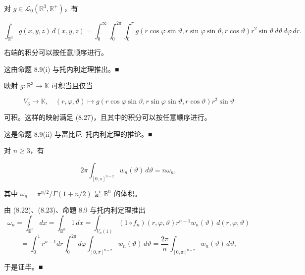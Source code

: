 \begin{example}

\begin{items}
\item

对 $ g \in \mathcal{L}_{0}(\mathbb{R}^{3}, \mathbb{R}^{+}) $，有

\begin{equation}
\int_{\mathbb{R}^{3}} g(x, y, z)\, d(x, y, z) = \int_{0}^{\infty}\int_{0}^{2\pi}\int_{0}^{\pi} g(r\cos\varphi\sin\vartheta, r\sin\varphi\sin\vartheta, r\cos\vartheta)r^{2}\sin\vartheta\, d\vartheta\, d\varphi\, dr.\tag{8.27}
\end{equation}

右端的积分可以按任意顺序进行。

\proofhead
这由命题 8.9(i) 与托内利定理推出。\nobreak\hspace{0.35em}■
\item

映射 $ g: \mathbb{R}^{3} \to \mathbb{K} $ 可积当且仅当

\[
V_{3} \to \mathbb{K}, \quad (r, \varphi, \vartheta) \mapsto g(r\cos\varphi\sin\vartheta, r\sin\varphi\sin\vartheta, r\cos\vartheta)r^{2}\sin\vartheta
\]

可积。这样的映射满足 (8.27)，且其中的积分可以按任意顺序进行。

\proofhead
这是命题 8.9(ii) 与富比尼–托内利定理的推论。\nobreak\hspace{0.35em}■
\item

对 $ n \ge 3 $，有

\[
2\pi\int_{[0, \pi]^{n-2}} w_{n}(\vartheta)\, d\vartheta = n\omega_{n},
\]

其中 $ \omega_{n} = \pi^{n/2}/\Gamma(1 + n/2) $ 是 $ \mathbb{B}^{n} $ 的体积。

\proofhead
由 (8.22)、(8.23)、命题 8.9 与托内利定理推出
\[
\omega_{n} = \int_{\mathbb{B}^{n}} dx = \int_{\mathbb{B}^{n}} 1\,dx = \int_{V_{n}(1)} (1\circ f_{n})(r, \varphi, \vartheta)r^{n-1}w_{n}(\vartheta)\, d(r, \varphi, \vartheta)
\]
\[
= \int_{0}^{1} r^{n-1}dr\int_{0}^{2\pi} d\varphi\int_{[0, \pi]^{n-2}} w_{n}(\vartheta)\, d\vartheta = \frac{2\pi}{n}\int_{[0, \pi]^{n-2}} w_{n}(\vartheta)\, d\vartheta,
\]

于是证毕。\nobreak\hspace{0.35em}■

\end{items}

\end{example}

